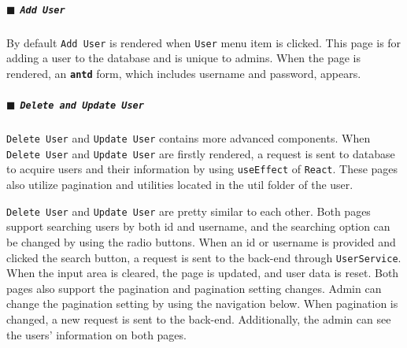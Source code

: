 \subparagraph{\texorpdfstring{$\blacksquare$}{-} \texttt{Add User}}

By default \texttt{Add User} is rendered when \texttt{User} menu item is clicked. This page is for adding a user to the database and is unique to admins. When the page is rendered, an \textbf{\texttt{antd}} form, which includes username and password, appears.

\subparagraph{\texorpdfstring{$\blacksquare$}{-} \texttt{Delete and Update User}}

\texttt{Delete User} and \texttt{Update User} contains more advanced components. When \texttt{Delete User} and \texttt{Update User} are firstly rendered, a request is sent to database to acquire users and their information by using \texttt{useEffect} of \texttt{React}. These pages also utilize pagination and utilities located in the util folder of the user.

\texttt{Delete User} and \texttt{Update User} are pretty similar to each other. Both pages support searching users by both id and username, and the searching option can be changed by using the radio buttons. When an id or username is provided and clicked the search button, a request is sent to the back-end through \texttt{UserService}. When the input area is cleared, the page is updated, and user data is reset. Both pages also support the pagination and pagination setting changes. Admin can change the pagination setting by using the navigation below. When pagination is changed, a new request is sent to the back-end. Additionally, the admin can see the users' information on both pages.

